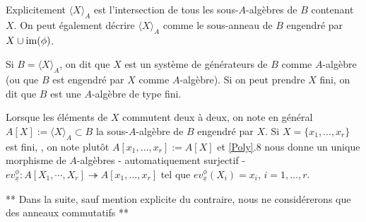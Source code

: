 	Explicitement $\langle X\rangle_A$ est l'intersection de tous les sous-$A$-algèbres de $B$ contenant $X$. On peut également décrire $\langle X\rangle_A$ comme  le sous-anneau de $B$ engendré par $X\cup\operatorname{im}(\phi)$.

	\begin{definition}Si $B=\langle X\rangle_A$, on dit que $X$ est un système de générateurs de $B$ comme $A$-algèbre (ou que $B$ est engendré par $X$ comme $A$-algèbre). Si on peut prendre $X$ fini, on dit que $B$ est une $A$-algèbre de type fini.\end{definition}

 Lorsque les éléments de $X$ commutent deux à deux, on note en général $A[X]:=\langle X\rangle_A \subset B$ la sous-$A$-algèbre de $B$ engendré par $X$. Si  $X=\lbrace x_1,\dots,x_r\rbrace $ est fini, , on note plutôt $A[x_1,\dots,x_r]:=A[X]$ et  \ref{Poly}.8  nous donne un unique morphisme de $A$-algèbres - automatiquement  surjectif - $ev_{\underline{x}}^\phi:A[X_1,\cdots, X_r]\twoheadrightarrow A[x_1,\dots, x_r] $ tel que $ev^\phi_{\underline{x}}(X_i)=x_i$, $i=1,\dots, r$. \\



 \begin{center} **  Dans la suite,  sauf mention explicite du contraire, nous ne considérerons que des anneaux commutatifs **\\\end{center}
